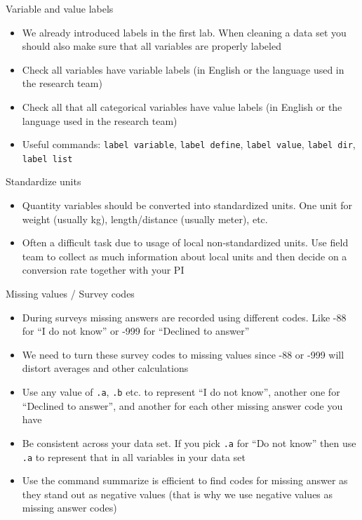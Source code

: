 \documentclass[aspectratio=169]{beamer}
\begin{document}
\begin{frame}{Variable and value labels }
	\begin{itemize}
		\item We already introduced labels in the first lab. When cleaning a data set you should also make sure that all variables are properly labeled
		\item Check all variables have variable labels (in English or the language used in the research team)
		\item Check all that all categorical variables have value labels (in English or the language used in the research team)
		\item Useful commands: \texttt{label variable}, \texttt{label define}, \texttt{label value}, \texttt{label dir}, \texttt{label list}
	\end{itemize}
\end{frame}

\begin{frame}{Standardize units }
	\begin{itemize}
		\item Quantity variables should be converted into standardized units. One unit for weight (usually kg), length/distance (usually meter), etc.
		\item Often a difficult task due to usage of local non-standardized units. Use field team to collect as much information about local units and then decide on a conversion rate together with your PI
	\end{itemize}
\end{frame}


\begin{frame}{Missing values / Survey codes}
	\begin{itemize}
		\item During surveys missing answers are recorded using different codes. Like -88 for “I do not know” or -999 for “Declined to answer”
		\item We need to turn these survey codes to missing values since -88 or -999 will distort averages and other calculations
		\item Use any value of \texttt{.a}, \texttt{.b} etc. to represent “I do not know”, another one for “Declined to answer”, and another for each other missing answer code you have
		\item Be consistent across your data set. If you pick \texttt{.a} for “Do not know” then use \texttt{.a} to represent that in all variables in your data set
		\item Use the command summarize is efficient to find codes for missing answer as they stand out as negative values (that is why we use negative values as missing answer codes)
	\end{itemize}
\end{frame}
\end{document}
